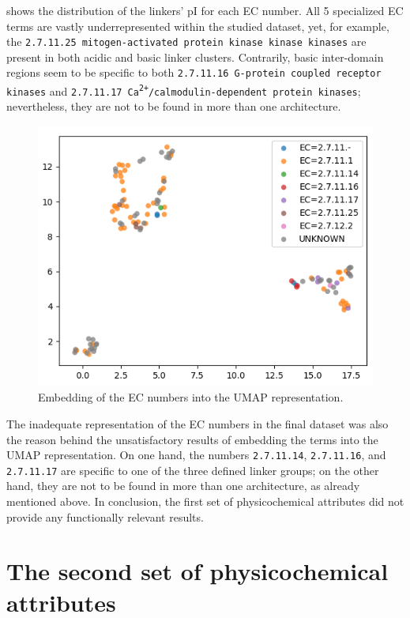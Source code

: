 		 shows the distribution of the linkers' pI for each EC number.
		All 5 specialized EC terms are vastly underrepresented within the studied dataset,
		yet, for example, the \texttt{2.7.11.25 mitogen-activated protein kinase kinase
		kinases} are present in both acidic and basic linker clusters.
		Contrarily, basic inter-domain regions seem to be specific to both \texttt{2.7.11.16
		G-protein coupled receptor kinases} and
		\texttt{2.7.11.17 Ca\textsuperscript{2+}/calmodulin-dependent protein kinases};
		nevertheless, they are not to be found in more than one architecture.

		\begin{figure}
			\centering
			\includegraphics[width=0.8\linewidth]{img/linker_umap_ec.png}
			\caption{Embedding of the EC numbers into the UMAP representation.}
			\label{fig:umap_ec}
		\end{figure}

		The inadequate representation of the EC numbers in the final dataset was also the
		reason behind the unsatisfactory results of embedding the terms into the UMAP
		representation.
		On one hand, the numbers \texttt{2.7.11.14}, \texttt{2.7.11.16}, and
		\texttt{2.7.11.17} are specific to one of the three defined linker groups; on the
		other hand, they are not to be found in more than one architecture, as already
		mentioned above.
		In conclusion, the first set of physicochemical attributes did not provide any
		functionally relevant results.

\section[The second set of physicochemical attributes]{The second set of
physicochemical\\ attributes}
\label{res:second}

